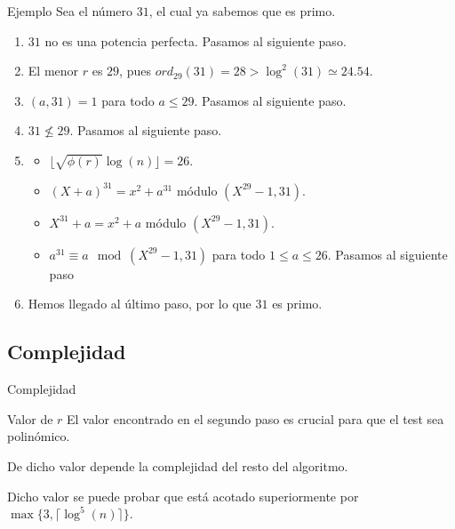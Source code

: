 \documentclass{beamer}
\begin{document}
\begin{frame}{Ejemplo}
	Sea el número $31$, el cual ya sabemos que es primo.
	
	\begin{enumerate}[<+(1)->]
		\item $31$ no es una potencia perfecta. Pasamos al siguiente paso.
		
		\item El menor $r$ es $29$, pues $ord_{29}(31) = 28 > \log^2(31) \simeq 24.54$.
		
		\item $(a, 31) = 1$ para todo $a \leq 29$. Pasamos al siguiente paso.
		
		\item $31 \not\leq 29$. Pasamos al siguiente paso.
		
		\item
		
		\begin{itemize}
			\item $\lfloor\sqrt{\phi(r)}\log(n)\rfloor = 26$.
			
			\item $(X + a)^{31} = x^2 + a^{31}$ módulo $(X^{29}-1, 31)$.
			
			\item $X^{31} + a = x^2 + a$ módulo $(X^{29}-1, 31)$.
			
			\item $a^{31} \equiv a \mod(X^{29}-1, 31)$ para todo $1 \leq a \leq 26$. Pasamos al siguiente paso
		\end{itemize}
		
		\item Hemos llegado al último paso, por lo que $31$ es primo.
	\end{enumerate}
\end{frame}

\subsection{Complejidad}

\begin{frame}
	\centering
	\begin{Large}
		Complejidad
	\end{Large}
\end{frame}

\begin{frame}{Valor de $r$}
	\onslide<1->El valor encontrado en el segundo paso es crucial para que el test sea polinómico.\break
	
	De dicho valor depende la complejidad del resto del algoritmo.\break
	
	Dicho valor se puede probar que está acotado superiormente por $\max\{3, \lceil\log^5(n)\rceil\}$.
\end{frame}
\end{document}
